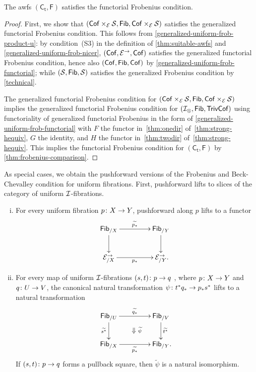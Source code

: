 \documentclass[reqno,10pt,a4paper,oneside,draft]{amsart}
\begin{document}
{{\begin{theorem} \label{uniform-fibrations-uniform-frobenius}
The awfs $(\mathsf{C_t}, \mathsf{F})$ satisfies the functorial Frobenius condition.
\end{theorem}

\begin{proof}
First, we show that $(\Cof \times_{\cal{E}} \cal{S}, \Fib, \Cof \times_{\cal{E}} \cal{S})$ satisfies the generalized functorial Frobenius condition.
This follows from \cref{generalized-uniform-frob-product-u}: by condition~(S3) in the definition of \cref{thm:suitable-awfs} and \cref{generalized-uniform-frob-nicer}, $(\Cof, \cal{E}^\to, \Cof)$ satisfies the generalized functorial Frobenius condition, hence also $(\Cof, \Fib, \Cof)$ by \cref{generalized-uniform-frob-functorial}; while $(\cal{S}, \Fib, \cal{S})$ satisfies the generalized Frobenius condition by \cref{technical}.

The generalized functorial Frobenius condition for $(\Cof \times_{\cal{E}} \cal{S}, \Fib, \Cof \times_{\cal{E}} \cal{S})$ implies the generalized functorial Frobenius condition for $(\cal{I}_\otimes, \Fib, \TrivCof)$ using functoriality of generalized functorial Frobenius in the form of \cref{generalized-uniform-frob-functorial} with $F$ the functor
in~\eqref{thm:onedir} of~\cref{thm:strong-hequiv}, $G$ the identity, and $H$ the functor
in~\eqref{thm:twodir} of~\cref{thm:strong-hequiv}. 
This implies the functorial Frobenius condition for $(\mathsf{C_t}, \mathsf{F})$ by \cref{thm:frobenius-comparison}.
\end{proof}

As special cases, we obtain the pushforward versions of the Frobenius and Beck-Chevalley condition for uniform fibrations.
First, pushforward lifts to slices of the category of uniform $\cal{I}$-fibrations.

\begin{corollary} \label{uniform-fibrations-frobenius-pushforward} \leavevmode
\begin{enumerate}[(i)]
\item For every uniform fibration
$p \co X \to Y$, pushforward along $p$ lifts to a functor
\[
\xymatrix@C+2em{
  \Fib_{/X}
  \ar[r]^{\widetilde{p_*}}
  \ar[d]
&
  \Fib_{/Y}
  \ar[d]
\\
  \catE_{/X}^\to
  \ar[r]_{p_*}
&
  \catE_{/Y}^\to
\rlap{.}}
\]
\item For every map of uniform $\cal{I}$-fibrations $(s, t) \co p \to q$ , where $p \co X \to Y$ and $q \co U \to V$, the canonical natural transformation $\psi \co t^* q_* \to p_* s^*$ lifts to a natural transformation
\[
\xymatrix@C+2em{
  \Fib_{/U}
  \ar[r]^{\widetilde{q_*}}
  \ar[d]_{\widetilde{s^*}}
  \ar@{}[dr]|{\textstyle\Downarrow \rlap{$\labelstyle \widetilde{\psi}$}}
&
  \Fib_{/V}
  \ar[d]^{\widetilde{t^*}}
\\
  \Fib_{/X}
  \ar[r]_{\widetilde{p_*}}
&
  \Fib_{/Y}
\rlap{.}}
\]
If $(s, t) \co p \to q$ forms a pullback square, then $\widetilde{\psi}$ is a natural isomorphism.
\end{enumerate}
\end{corollary}

}}
\end{document}

